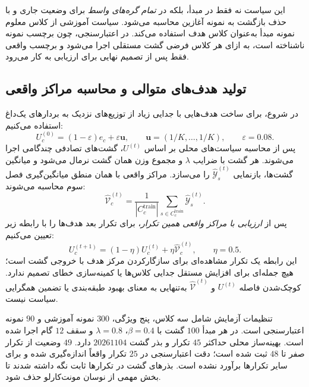 این سیاست نه فقط در مبدأ، بلکه در \emph{تمام گره‌های واسط} برای وضعیت جاری و با حذف بازگشت به نمونه آغازین محاسبه می‌شود. سیاست آموزشی از کلاس معلوم نمونه مبدأ به‌عنوان کلاس هدف استفاده می‌کند. در اعتبارسنجی، چون برچسب نمونه ناشناخته است، به ازای هر کلاس فرضی گشت مستقلی اجرا می‌شود و برچسب واقعی فقط پس از تصمیم نهایی برای ارزیابی به کار می‌رود.

\subsection{تولید هدف‌های متوالی و محاسبه مراکز واقعی}
\label{subsec:ch4-center-observation-iteration}
در شروع، برای ساخت هدف‌هایی با جدایی زیاد از توزیع‌های نزدیک به بردارهای یک‌داغ استفاده می‌کنیم:
\begin{equation}\label{eq:ch4-center-observation-initial-target}
U_c^{(0)}=(1-\varepsilon)e_c+\varepsilon\boldsymbol u,\qquad
\boldsymbol u=(1/K,\ldots,1/K),\qquad\varepsilon=0.08.
\end{equation}
پس از محاسبه سیاست‌های محلی بر اساس $U^{(t)}$، گشت‌های تصادفی چندگامی اجرا می‌شوند. هر گشت با ضرایب $\lambda$ و مجموع وزن همان گشت نرمال می‌شود و میانگین گشت‌ها، بازنمایی $\widehat{\mathscr Y}_s^{(t)}$ را می‌سازد. مراکز واقعی با همان منطق میانگین‌گیری فصل سوم محاسبه می‌شوند:
\begin{equation}\label{eq:ch4-center-observation-realized}
\boxed{
\widehat{\mathcal V}_c^{(t)}=
\frac{1}{|C_c^{\mathrm{train}}|}
\sum_{s\in C_c^{\mathrm{train}}}\widehat{\mathscr Y}_s^{(t)}.
}
\end{equation}
پس از \emph{ارزیابی با مراکز واقعی همین تکرار}، برای تکرار بعد هدف‌ها را با رابطه زیر تعیین می‌کنیم:
\begin{equation}\label{eq:ch4-center-observation-update}
\boxed{U_c^{(t+1)}=(1-\eta)U_c^{(t)}+
\eta\widehat{\mathcal V}_c^{(t)},\qquad\eta=0.5.}
\end{equation}
این رابطه یک تکرار مشاهده‌ای برای سازگارکردن مرکز هدف با خروجی گشت است؛ هیچ جمله‌ای برای افزایش مستقل جدایی کلاس‌ها یا کمینه‌سازی خطای تصمیم ندارد. کوچک‌شدن فاصله $U^{(t)}$ و $\widehat{\mathcal V}^{(t)}$ به‌تنهایی به معنای بهبود طبقه‌بندی یا تضمین همگرایی سیاست نیست.

تنظیمات آزمایش شامل سه کلاس، پنج ویژگی، $300$ نمونه آموزشی و $90$ نمونه اعتبارسنجی است. در هر مبدأ $100$ گشت با $\beta=0.4$، $\lambda=0.8$ و سقف $12$ گام اجرا شده است. بهینه‌ساز محلی حداکثر $45$ تکرار و بذر گشت $20261104$ دارد. $49$ وضعیت از تکرار صفر تا $48$ ثبت شده است؛ دقت اعتبارسنجی در $25$ تکرار واقعاً اندازه‌گیری شده و برای سایر تکرارها برآورد نشده است. بذرهای گشت در تکرارها ثابت نگه داشته شدند تا بخش مهمی از نوسان مونت‌کارلو حذف شود.

